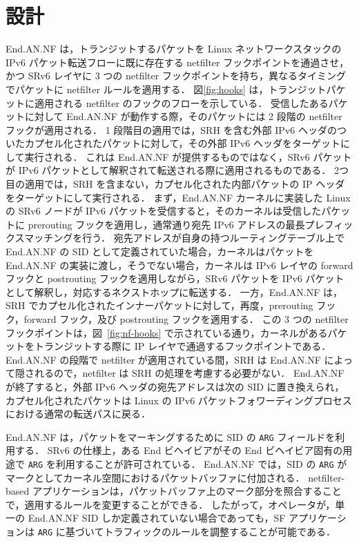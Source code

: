 \section{設計}
\label{section:design}
End.AN.NF は，トランジットするパケットを Linux ネットワークスタックの IPv6 パケット転送フローに既に存在する netfilter フックポイントを通過させ，かつ SRv6 レイヤに 3 つの netfilter フックポイントを持ち，異なるタイミングでパケットに netfilter ルールを適用する．
図\ref*{fig:hooks} は，トランジットパケットに適用される netfilter のフックのフローを示している．
受信したあるパケットに対して End.AN.NF が動作する際，そのパケットには 2 段階の netfilter フックが適用される．
1 段階目の適用では，SRH を含む外部 IPv6 ヘッダのついたカプセル化されたパケットに対して，その外部 IPv6 ヘッダをターゲットにして実行される．
これは End.AN.NF が提供するものではなく，SRv6 パケットが IPv6 パケットとして解釈されて転送される際に適用されるものである．
2つ目の適用では，SRH を含まない，カプセル化された内部パケットの IP ヘッダをターゲットにして実行される．
まず，End.AN.NF カーネルに実装した Linux の SRv6 ノードが IPv6 パケットを受信すると，そのカーネルは受信したパケットに prerouting フックを適用し，通常通り宛先 IPv6 アドレスの最長プレフィックスマッチングを行う．
宛先アドレスが自身の持つルーティングテーブル上で End.AN.NF の SID として定義されていた場合，カーネルはパケットを End.AN.NF の実装に渡し，そうでない場合，カーネルは IPv6 レイヤの forward フックと postrouting フックを適用しながら，SRv6 パケットを IPv6 パケットとして解釈し，対応するネクストホップに転送する．
一方，End.AN.NF は，SRH でカプセル化されたインナーパケットに対して，再度，prerouting フック，forward フック，及び postrouting フックを適用する．
この 3 つの netfilter フックポイントは，図~\ref*{fig:nf-hooks} で示されている通り，カーネルがあるパケットをトランジットする際に IP レイヤで通過するフックポイントである．
End.AN.NF の段階で netfilter が適用されている間，SRH は End.AN.NF によって隠されるので，netfilter は SRH の処理を考慮する必要がない．
End.AN.NF が終了すると，外部 IPv6 ヘッダの宛先アドレスは次の SID に置き換えられ，カプセル化されたパケットは Linux の IPv6 パケットフォワーディングプロセスにおける通常の転送パスに戻る．

End.AN.NF は，パケットをマーキングするために SID の \texttt{ARG} フィールドを利用する．
SRv6 の仕様上，ある End ビヘイビアがその End ビヘイビア固有の用途で \texttt{ARG} を利用することが許可されている．
End.AN.NF では，SID の \texttt{ARG} がマークとしてカーネル空間におけるパケットバッファに付加される．
netfilter-based アプリケーションは，パケットバッファ上のマーク部分を照合することで，適用するルールを変更することができる．
したがって，オペレータが，単一の End.AN.NF SID しか定義されていない場合であっても，SF アプリケーションは \texttt{ARG} に基づいてトラフィックのルールを調整することが可能である．

